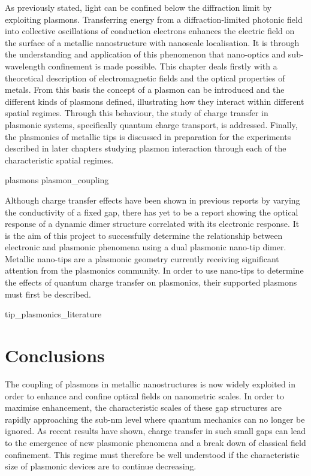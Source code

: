 \documentclass[12pt, a4paper, oneside]{book}
\begin{document}
As previously stated, light can be confined below the diffraction limit by exploiting plasmons. Transferring energy from a diffraction-limited photonic field into collective oscillations of conduction electrons enhances the electric field on the surface of a metallic nanostructure with nanoscale localisation. It is through the understanding and application of this phenomenon that nano-optics and sub-wavelength confinement is made possible.
This chapter deals firstly with a theoretical description of electromagnetic fields and the optical properties of metals. From this basis the concept of a plasmon can be introduced and the different kinds of plasmons defined, illustrating how they interact within different spatial regimes. Through this behaviour, the study of charge transfer in plasmonic systems, specifically quantum charge transport, is addressed. Finally, the plasmonics of metallic tips is discussed in preparation for the experiments described in later chapters studying plasmon interaction through each of the characteristic spatial regimes.

{plasmons}
{plasmon_coupling}

Although charge transfer effects have been shown in previous reports by varying the conductivity of a fixed gap, there has yet to be a report showing the optical response of a dynamic dimer structure correlated with its electronic response. It is the aim of this project to successfully determine the relationship between electronic and plasmonic phenomena using a dual plasmonic nano-tip dimer. Metallic nano-tips are a plasmonic geometry currently receiving significant attention from the plasmonics community. In order to use nano-tips to determine the effects of quantum charge transfer on plasmonics, their supported plasmons must first be described.

{tip_plasmonics_literature}

\section{Conclusions}

The coupling of plasmons in metallic nanostructures is now widely exploited in order to enhance and confine optical fields on nanometric scales. In order to maximise enhancement, the characteristic scales of these gap structures are rapidly approaching the sub-nm level where quantum mechanics can no longer be ignored. As recent results have shown, charge transfer in such small gaps can lead to the emergence of new plasmonic phenomena and a break down of classical field confinement. This regime must therefore be well understood if the characteristic size of plasmonic devices are to continue decreasing.
\end{document}

